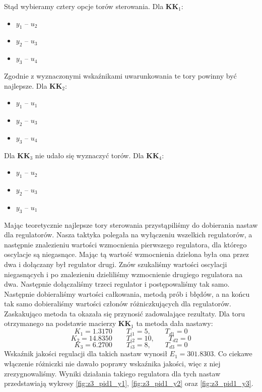 Stąd wybieramy cztery opcje torów sterowania. Dla $\bm{KK}_1$:
\begin{itemize}
  \item $y_1$ -- $u_2$
 \item $y_2$ -- $u_3$
 \item $y_3$ -- $u_4$
\end{itemize}
Zgodnie z wyznaczonymi wskaźnikami uwarunkowania te tory powinny być najlepsze. Dla $\bm{KK}_2$:
\begin{itemize}
  \item $y_1$ -- $u_1$
 \item $y_2$ -- $u_3$
 \item $y_3$ -- $u_4$
\end{itemize}
Dla $\bm{KK}_3$ nie udało się wyznaczyć torów. Dla $\bm{KK}_4$:
\begin{itemize}
  \item $y_1$ -- $u_2$
 \item $y_2$ -- $u_3$
 \item $y_3$ -- $u_1$
\end{itemize}
Mając teoretycznie najlepsze tory sterowania przystąpiliśmy do dobierania nastaw
dla regulatorów. Nasza taktyka polegała na wyłączeniu wszelkich regulatorów, a
następnie znalezieniu wartości wzmocnienia pierwszego regulatora, dla którego
oscylacje są niegasnące. Mając tą wartość wzmocnienia dzielona była ona przez
dwa i dołączany był regulator drugi. Znów szukaliśmy wartości oscylacji niegasnących
i po znalezieniu dzieliliśmy wzmocnienie drugiego regulatora na dwa. Następnie
dołączaliśmy trzeci regulator i postępowaliśmy tak samo. Następnie dobieraliśmy
wartości całkowania, metodą prób i błędów, a na końcu tak samo dobieraliśmy
wartości członów różniczkujących dla regulatorów. Zaskakująco metoda ta okazała się
przynosić zadowalające rezultaty. Dla toru otrzymanego na podstawie macierzy $\bm{KK}_1$
ta metoda dała nastawy:
\begin{equation}
  K_1 = \num{1,3170} \qquad T_{i1} = 5, \qquad T_{d1} = 0 \nonumber
\end{equation}
\begin{equation}
  K_2 = \num{14,8350} \qquad T_{i2} = 10, \qquad T_{d2} = 0
\end{equation}
\begin{equation}
  K_3 = \num{6,2700} \qquad T_{i3} = 8, \qquad T_{d3} = 0 \nonumber
\end{equation}
Wskaźnik jakości regulacji dla takich nastaw wynosił $E_1 = \num{301,8303}$.
Co ciekawe włączenie różniczki nie dawało poprawy wskaźnika jakości, więc z niej
zrezygnowaliśmy.
Wyniki działania takiego regulatora dla tych nastaw przedstawiają wykresy \ref{fig:z3_pid1_y1},
\ref{fig:z3_pid1_y2} oraz \ref{fig:z3_pid1_y3}.

